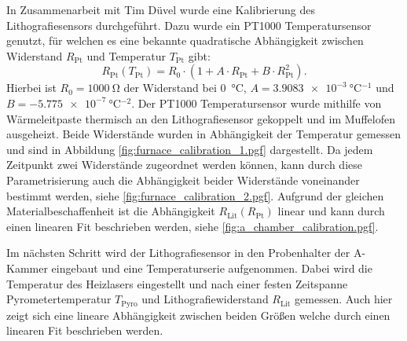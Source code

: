 In Zusammenarbeit mit Tim Düvel wurde eine Kalibrierung des Lithografiesensors durchgeführt.
Dazu wurde ein PT1000 Temperatursensor genutzt, für welchen es eine bekannte quadratische Abhängigkeit zwischen Widerstand
$R_{\mathrm{Pt}}$ und Temperatur $T_{\mathrm{Pt}}$ gibt:
\begin{equation}
    R_{\mathrm{Pt}}(T_{\mathrm{Pt}})
    =R_0 \cdot (1 + A \cdot R_{\mathrm{Pt}} + B \cdot R_{\mathrm{Pt}}^2).
    \label{eq:pt1000_calibration}
\end{equation}
Hierbei ist $R_0 = \qty{1000}{\ohm}$ der Widerstand bei \qty{0}{\degreeCelsius},
$A = \qty{3.9083e-3}{\degreeCelsius^{-1}}$ und $B = \qty{-5.775e-7}{\degreeCelsius^{-2}}$.
Der PT1000 Temperatursensor wurde mithilfe von Wärmeleitpaste thermisch an den Lithografiesensor gekoppelt und
im Muffelofen ausgeheizt.
Beide Widerstände wurden in Abhängigkeit der Temperatur gemessen und sind in Abbildung
\cref{fig:furnace_calibration_1.pgf} dargestellt.
Da jedem Zeitpunkt zwei Widerstände zugeordnet werden können, kann durch diese Parametrisierung auch die Abhängigkeit
beider Widerstände voneinander bestimmt werden, siehe \cref{fig:furnace_calibration_2.pgf}.
Aufgrund der gleichen Materialbeschaffenheit ist die Abhängigkeit $R_\mathrm{Lit}(R_\mathrm{Pt})$ linear und kann durch
einen linearen Fit beschrieben werden, siehe \cref{fig:a_chamber_calibration.pgf}.

Im nächsten Schritt wird der Lithografiesensor in den Probenhalter der A-Kammer eingebaut und eine Temperaturserie
aufgenommen.
Dabei wird die Temperatur des Heizlasers eingestellt und nach einer festen Zeitspanne Pyrometertemperatur
$T_\mathrm{Pyro}$ und Lithografiewiderstand $R_\mathrm{Lit}$ gemessen.
Auch hier zeigt sich eine lineare Abhängigkeit zwischen beiden Größen welche durch einen linearen Fit
beschrieben werden.

